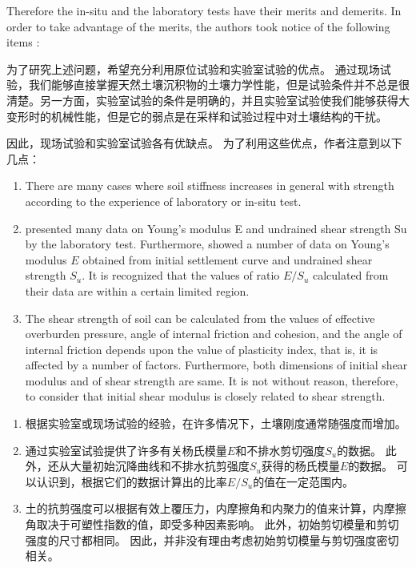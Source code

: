 \begin{paracol}{2}
    Therefore the in-situ and the laboratory tests have their merits and demerits. In order to take advantage of the merits, the authors took notice of the following items : 

    \switchcolumn

    为了研究上述问题，希望充分利用原位试验和实验室试验的优点。 通过现场试验，我们能够直接掌握天然土壤沉积物的土壤力学性能，但是试验条件并不总是很清楚。另一方面，实验室试验的条件是明确的，并且实验室试验使我们能够获得大变形时的机械性能，但是它的弱点是在采样和试验过程中对土壤结构的干扰。
  
    因此，现场试验和实验室试验各有优缺点。 为了利用这些优点，作者注意到以下几点：

    \switchcolumn*

    \begin{enumerate}
        \item There are many cases where soil stiffness increases in general with strength according to the experience of laboratory or in-situ test.
        \item \citet{Wilson2010419} presented many data on Young's modulus E and undrained shear strength Su by the laboratory test. Furthermore, \citet{DAppolonia19711359} showed a number of data on Young's modulus $E$ obtained from initial settlement curve and undrained shear strength $S_u$. It is recognized that the values of ratio $E/S_u$ calculated from their data are within a certain limited region.
        \item The shear strength of soil can be calculated from the values of effective overburden pressure, angle of internal friction and cohesion, and the angle of internal friction depends upon the value of plasticity index, that is, it is affected by a number of factors. Furthermore, both dimensions of initial shear modulus and of shear strength are same. It is not without reason, therefore, to consider that initial shear modulus is closely related to shear strength.
    \end{enumerate}

    \switchcolumn

    \begin{enumerate}
        \item 根据实验室或现场试验的经验，在许多情况下，土壤刚度通常随强度而增加。
        \item \citet{Wilson2010419}通过实验室试验提供了许多有关杨氏模量$E$和不排水剪切强度$S_u$的数据。 此外，\citet{DAppolonia19711359}还从大量初始沉降曲线和不排水抗剪强度$S_u$获得的杨氏模量$E$的数据。 可以认识到，根据它们的数据计算出的比率$E/S_u$的值在一定范围内。
        \item 土的抗剪强度可以根据有效上覆压力，内摩擦角和内聚力的值来计算，内摩擦角取决于可塑性指数的值，即受多种因素影响。 此外，初始剪切模量和剪切强度的尺寸都相同。 因此，并非没有理由考虑初始剪切模量与剪切强度密切相关。
    \end{enumerate}


\end{paracol}
